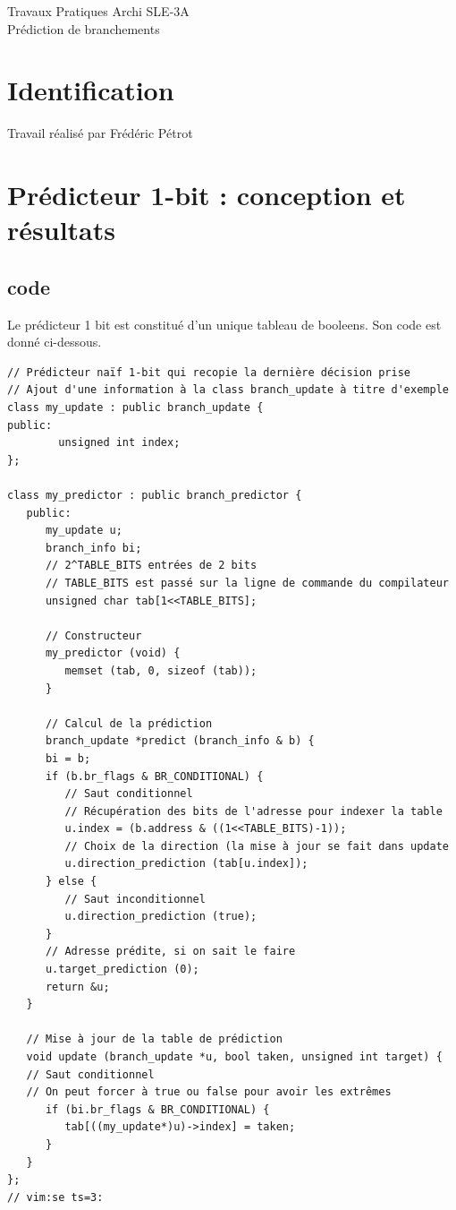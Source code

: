 \documentclass[a4paper]{article}
\begin{document}
\begin{center}
\large
Travaux Pratiques Archi SLE-3A\\
\LARGE
Prédiction de branchements\\
\large

\end{center}
\section{Identification}
Travail réalisé par Frédéric Pétrot

\section{Prédicteur 1-bit : conception et résultats}
\subsection{code}
Le prédicteur 1 bit est constitué d'un unique tableau de booleens.
Son code est donné ci-dessous.
\small
\begin{verbatim}
// Prédicteur naïf 1-bit qui recopie la dernière décision prise
// Ajout d'une information à la class branch_update à titre d'exemple
class my_update : public branch_update {
public:
        unsigned int index;
};

class my_predictor : public branch_predictor {
   public:
      my_update u;
      branch_info bi;
      // 2^TABLE_BITS entrées de 2 bits
      // TABLE_BITS est passé sur la ligne de commande du compilateur
      unsigned char tab[1<<TABLE_BITS];

      // Constructeur
      my_predictor (void) { 
         memset (tab, 0, sizeof (tab));
      }

      // Calcul de la prédiction
      branch_update *predict (branch_info & b) {
      bi = b;
      if (b.br_flags & BR_CONDITIONAL) {
         // Saut conditionnel
         // Récupération des bits de l'adresse pour indexer la table
         u.index = (b.address & ((1<<TABLE_BITS)-1));
         // Choix de la direction (la mise à jour se fait dans update
         u.direction_prediction (tab[u.index]);
      } else {
         // Saut inconditionnel
         u.direction_prediction (true);
      }
      // Adresse prédite, si on sait le faire
      u.target_prediction (0);
      return &u;
   }

   // Mise à jour de la table de prédiction
   void update (branch_update *u, bool taken, unsigned int target) {
   // Saut conditionnel
   // On peut forcer à true ou false pour avoir les extrêmes
      if (bi.br_flags & BR_CONDITIONAL) {
         tab[((my_update*)u)->index] = taken;
      }
   }
};
// vim:se ts=3:
\end{verbatim}
\normalsize
\end{document}
